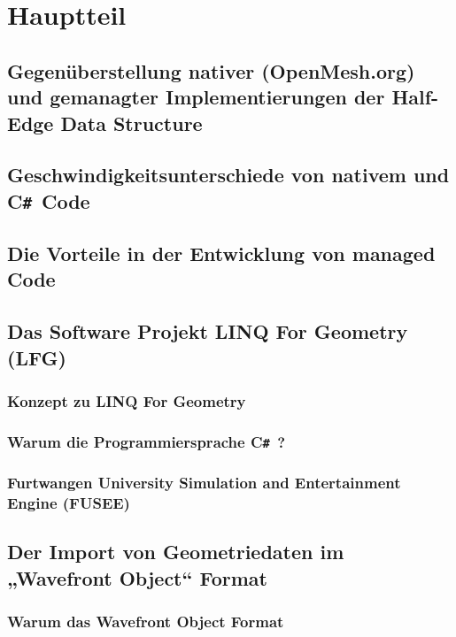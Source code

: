 \documentclass[pagesize, paper=a4, fontsize=12pt,titlepage=true, headings=small, headnosepline, abstractoff, liststotoc, nochapterprefix, plainheadsepline]{scrreprt}
\newcommand{\CSS}{C\texttt{\# }}
\newcommand{\LFG}{LINQ For Geometry}
\begin{document}




\chapter {Hauptteil}
	\section {Gegenüberstellung nativer (OpenMesh.org) und gemanagter Implementierungen der Half-Edge Data Structure}
	\section {Geschwindigkeitsunterschiede von nativem und \CSS Code}
	\section {Die Vorteile in der Entwicklung von managed Code}
	\section {Das Software Projekt LINQ For Geometry (LFG)}
		\subsection {Konzept zu \LFG}
		\subsection {Warum die Programmiersprache \CSS ?}
		\subsection {Furtwangen University Simulation and Entertainment Engine (FUSEE)}
	\section {Der Import von Geometriedaten im „Wavefront Object“ Format}
		\subsection {Warum das Wavefront Object Format}
\end{document}
